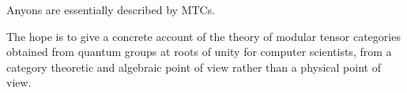 Anyons are essentially described by MTCs. 



The hope is to give a concrete account of the theory of modular tensor
categories obtained from quantum groups at roots of unity for computer
scientists, from a category theoretic and algebraic point of view rather than a
physical point of view. 

